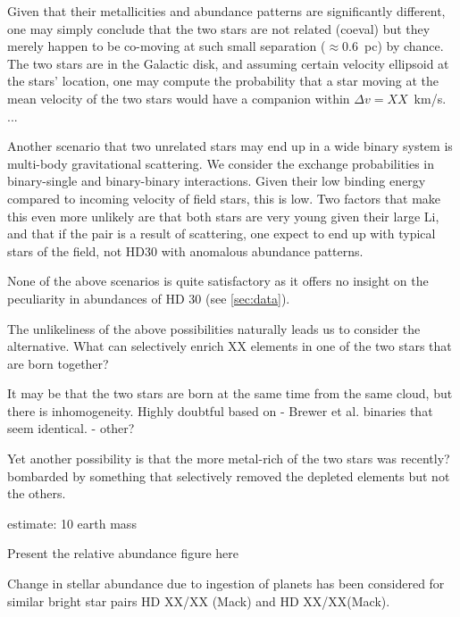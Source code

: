 \documentclass[manuscript]{aastex6}
\begin{document}
Given that their metallicities and abundance patterns are significantly
different, one may simply conclude that the two stars are not related (coeval)
but they merely happen to be co-moving at such small separation ($\approx 0.6$~pc)
by chance.
The two stars are in the Galactic disk, and assuming certain velocity ellipsoid
at the stars' location, one may compute the probability that a star moving at
the mean velocity of the two stars would have a companion within $\Delta v = XX$~km/s.
...

Another scenario that two unrelated stars may end up in a wide binary system
is multi-body gravitational scattering.
We consider the exchange probabilities in binary-single and binary-binary interactions.
Given their low binding energy compared to incoming velocity of field stars,
this is low.
Two factors that make this even more unlikely are that both stars are very young given their large Li,
and that if the pair is a result of scattering, one expect to end up with typical stars of the field,
not HD30 with anomalous abundance patterns.


None of the above scenarios is quite satisfactory as it offers no
insight on the peculiarity in abundances of HD 30 (see \ref{sec:data}).

The unlikeliness of the above possibilities naturally leads us to
consider the alternative.
What can selectively enrich XX elements in one of the two stars that are born together?

It may be that the two stars are born at the same time from the same cloud, but
there is inhomogeneity. Highly doubtful based on
- Brewer et al. binaries that seem identical.
- other?

Yet another possibility is that the more metal-rich of the two stars
was recently? bombarded by something that selectively removed the depleted elements but not the others.

estimate: 10 earth mass

Present the relative abundance figure here

Change in stellar abundance due to ingestion of planets has been considered
for similar bright star pairs HD XX/XX (Mack) and HD XX/XX(Mack).





\end{document}
